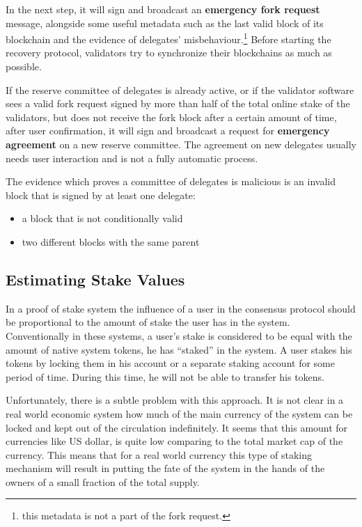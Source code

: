 In the next step, it will sign and broadcast an \textbf{emergency fork request} message, alongside some useful metadata
such as the last valid block of its blockchain and the evidence of delegates' misbehaviour.\footnote{this metadata is
not a part of the fork request.} Before starting the recovery protocol, validators try to synchronize their blockchains
as much as possible.

If the reserve committee of delegates is already active, or if the validator software sees a valid fork request signed
by more than half of the total online stake of the validators, but does not receive the fork
block after a certain amount of time, after user confirmation, it will sign and broadcast a request for
\textbf{emergency agreement} on a new reserve committee. The agreement on new delegates usually needs user
interaction and is not a fully automatic process.

The evidence which proves a committee of delegates is malicious is an invalid block that is signed by at least
one delegate:
\begin{itemize}
    \item a block that is not conditionally valid
    \item two different blocks with the same parent
\end{itemize}

\subsection{Estimating Stake Values}\label{subsec:user's-stake}

In a proof of stake system the influence of a user in the consensus protocol should be proportional to the amount
of stake the user has in the system. Conventionally in these systems, a user's stake is considered to be equal with the
amount of native system tokens, he has ``staked'' in the system. A user stakes his tokens by locking them in
his account or a separate staking account for some period of time. During this time, he will not be able to transfer
his tokens.

Unfortunately, there is a subtle problem with this approach. It is not clear in a real world economic system
how much of the main currency of the system can be locked and kept out of the circulation indefinitely. It seems that
this amount for currencies like US dollar, is quite low comparing to the total market cap of the currency.
This means that for a real world currency this type of staking mechanism will result in putting the
fate of the system in the hands of the owners of a small fraction of the total supply.

